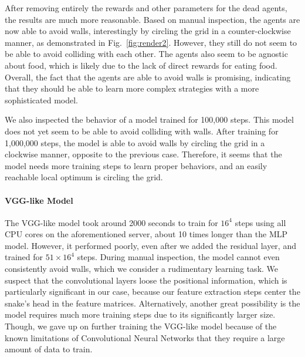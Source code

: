\documentclass[conference]{IEEEtran}
\begin{document}
After removing entirely the rewards and other parameters for the dead agents,
the results are much more reasonable. Based on manual inspection,
the agents are now able to avoid walls,
interestingly by circling the grid in a counter-clockwise manner,
as demonstrated in Fig.~\ref{fig:render2}. However,
they still do not seem to be able to avoid colliding with each other.
The agents also seem to be agnostic about food,
which is likely due to the lack of direct rewards for eating food. Overall,
the fact that the agents are able to avoid walls is promising,
indicating that they should be able to learn more complex strategies with a more
sophisticated model.

We also inspected the behavior of a model trained for 100,000 steps.
This model does not yet seem to be able to avoid colliding with walls.
After training for 1,000,000 steps,
the model is able to avoid walls by circling the grid in a clockwise manner,
opposite to the previous case. Therefore,
it seems that the model needs more training steps to learn proper behaviors,
and an easily reachable local optimum is circling the grid.

\paragraph{VGG-like Model}
The VGG-like model took around 2000 seconds to train for $16^4$ steps using all
CPU cores on the aforementioned server,
about 10 times longer than the MLP model. However, it performed poorly,
even after we added the residual layer, and trained for $51 \times 16^4$ steps.
During manual inspection, the model cannot even consistently avoid walls,
which we consider a rudimentary learning task.
We suspect that the convolutional layers loose the positional information,
which is particularly significant in our case,
because our feature extraction steps center the snake's head in the feature
matrices. Alternatively,
another great possibility is the model requires much more training steps due to
its significantly larger size. Though,
we gave up on further training the VGG-like model because of the known
limitations of Convolutional Neural Networks that they require a large amount of
data to train.
\end{document}
